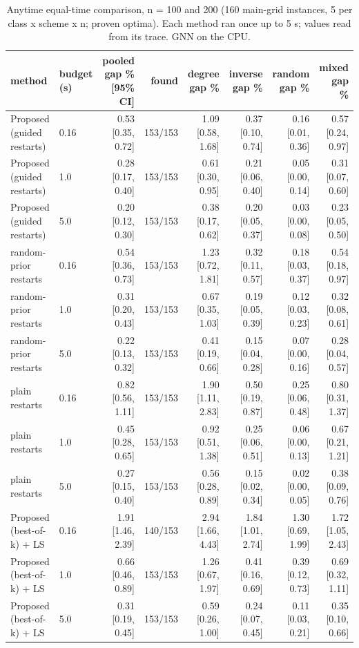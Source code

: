 \begin{table}[t]
\centering
\caption{Anytime equal-time comparison, n = 100 and 200 (160 main-grid instances, 5 per class x scheme x n; proven optima). Each method ran once up to 5 s; values read from its trace. GNN on the CPU.}
\label{tab:rev2_step1_gaps}
\scriptsize
\begin{tabular}{llrrrrrr}
\toprule
method & budget (s) & pooled gap \% [95\% CI] & found & degree gap \% & inverse gap \% & random gap \% & mixed gap \% \\
\midrule
Proposed (guided restarts) & 0.16 & 0.53 [0.35, 0.72] & 153/153 & 1.09 [0.58, 1.68] & 0.37 [0.10, 0.74] & 0.16 [0.01, 0.36] & 0.57 [0.24, 0.97] \\
Proposed (guided restarts) & 1.0 & 0.28 [0.17, 0.40] & 153/153 & 0.61 [0.30, 0.95] & 0.21 [0.06, 0.40] & 0.05 [0.00, 0.14] & 0.31 [0.07, 0.60] \\
Proposed (guided restarts) & 5.0 & 0.20 [0.12, 0.30] & 153/153 & 0.38 [0.17, 0.62] & 0.20 [0.05, 0.37] & 0.03 [0.00, 0.08] & 0.23 [0.05, 0.50] \\
random-prior restarts & 0.16 & 0.54 [0.36, 0.73] & 153/153 & 1.23 [0.72, 1.81] & 0.32 [0.11, 0.57] & 0.18 [0.03, 0.37] & 0.54 [0.18, 0.97] \\
random-prior restarts & 1.0 & 0.31 [0.20, 0.43] & 153/153 & 0.67 [0.35, 1.03] & 0.19 [0.05, 0.39] & 0.12 [0.03, 0.23] & 0.32 [0.08, 0.61] \\
random-prior restarts & 5.0 & 0.22 [0.13, 0.32] & 153/153 & 0.41 [0.19, 0.66] & 0.15 [0.04, 0.28] & 0.07 [0.00, 0.16] & 0.28 [0.04, 0.57] \\
plain restarts & 0.16 & 0.82 [0.56, 1.11] & 153/153 & 1.90 [1.11, 2.83] & 0.50 [0.19, 0.87] & 0.25 [0.06, 0.48] & 0.80 [0.31, 1.37] \\
plain restarts & 1.0 & 0.45 [0.28, 0.65] & 153/153 & 0.92 [0.51, 1.38] & 0.25 [0.06, 0.51] & 0.06 [0.00, 0.13] & 0.67 [0.21, 1.21] \\
plain restarts & 5.0 & 0.27 [0.15, 0.40] & 153/153 & 0.56 [0.28, 0.89] & 0.15 [0.02, 0.34] & 0.02 [0.00, 0.05] & 0.38 [0.09, 0.76] \\
Proposed (best-of-k) + LS & 0.16 & 1.91 [1.46, 2.39] & 140/153 & 2.94 [1.66, 4.43] & 1.84 [1.01, 2.74] & 1.30 [0.69, 1.99] & 1.72 [1.05, 2.43] \\
Proposed (best-of-k) + LS & 1.0 & 0.66 [0.46, 0.89] & 153/153 & 1.26 [0.67, 1.97] & 0.41 [0.16, 0.69] & 0.39 [0.12, 0.73] & 0.69 [0.32, 1.11] \\
Proposed (best-of-k) + LS & 5.0 & 0.31 [0.19, 0.45] & 153/153 & 0.59 [0.26, 1.00] & 0.24 [0.07, 0.45] & 0.11 [0.03, 0.21] & 0.35 [0.10, 0.66] \\

\end{tabular}
\end{table}

